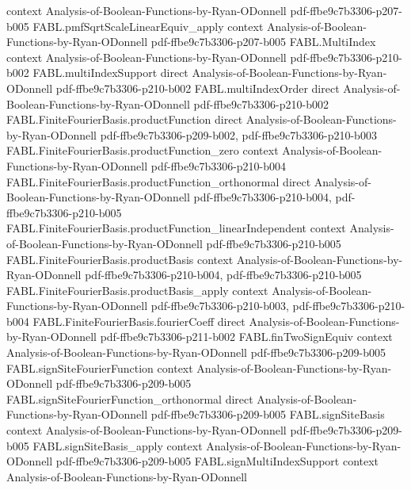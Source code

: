 \begin{theorem}
  {context}
  {Analysis-of-Boolean-Functions-by-Ryan-ODonnell}
  {pdf-ffbe9c7b3306-p207-b005}
\proofstep
  {FABL.pmfSqrtScaleLinearEquiv_apply}
  {context}
  {Analysis-of-Boolean-Functions-by-Ryan-ODonnell}
  {pdf-ffbe9c7b3306-p207-b005}
\proofstep
  {FABL.MultiIndex}
  {context}
  {Analysis-of-Boolean-Functions-by-Ryan-ODonnell}
  {pdf-ffbe9c7b3306-p210-b002}
\proofstep
  {FABL.multiIndexSupport}
  {direct}
  {Analysis-of-Boolean-Functions-by-Ryan-ODonnell}
  {pdf-ffbe9c7b3306-p210-b002}
\proofstep
  {FABL.multiIndexOrder}
  {direct}
  {Analysis-of-Boolean-Functions-by-Ryan-ODonnell}
  {pdf-ffbe9c7b3306-p210-b002}
\proofstep
  {FABL.FiniteFourierBasis.productFunction}
  {direct}
  {Analysis-of-Boolean-Functions-by-Ryan-ODonnell}
  {pdf-ffbe9c7b3306-p209-b002,
    pdf-ffbe9c7b3306-p210-b003}
\proofstep
  {FABL.FiniteFourierBasis.productFunction_zero}
  {context}
  {Analysis-of-Boolean-Functions-by-Ryan-ODonnell}
  {pdf-ffbe9c7b3306-p210-b004}
\proofstep
  {FABL.FiniteFourierBasis.productFunction_orthonormal}
  {direct}
  {Analysis-of-Boolean-Functions-by-Ryan-ODonnell}
  {pdf-ffbe9c7b3306-p210-b004,
    pdf-ffbe9c7b3306-p210-b005}
\proofstep
  {FABL.FiniteFourierBasis.productFunction_linearIndependent}
  {context}
  {Analysis-of-Boolean-Functions-by-Ryan-ODonnell}
  {pdf-ffbe9c7b3306-p210-b005}
\proofstep
  {FABL.FiniteFourierBasis.productBasis}
  {context}
  {Analysis-of-Boolean-Functions-by-Ryan-ODonnell}
  {pdf-ffbe9c7b3306-p210-b004,
    pdf-ffbe9c7b3306-p210-b005}
\proofstep
  {FABL.FiniteFourierBasis.productBasis_apply}
  {context}
  {Analysis-of-Boolean-Functions-by-Ryan-ODonnell}
  {pdf-ffbe9c7b3306-p210-b003,
    pdf-ffbe9c7b3306-p210-b004}
\proofstep
  {FABL.FiniteFourierBasis.fourierCoeff}
  {direct}
  {Analysis-of-Boolean-Functions-by-Ryan-ODonnell}
  {pdf-ffbe9c7b3306-p211-b002}
\proofstep
  {FABL.finTwoSignEquiv}
  {context}
  {Analysis-of-Boolean-Functions-by-Ryan-ODonnell}
  {pdf-ffbe9c7b3306-p209-b005}
\proofstep
  {FABL.signSiteFourierFunction}
  {context}
  {Analysis-of-Boolean-Functions-by-Ryan-ODonnell}
  {pdf-ffbe9c7b3306-p209-b005}
\proofstep
  {FABL.signSiteFourierFunction_orthonormal}
  {direct}
  {Analysis-of-Boolean-Functions-by-Ryan-ODonnell}
  {pdf-ffbe9c7b3306-p209-b005}
\proofstep
  {FABL.signSiteBasis}
  {context}
  {Analysis-of-Boolean-Functions-by-Ryan-ODonnell}
  {pdf-ffbe9c7b3306-p209-b005}
\proofstep
  {FABL.signSiteBasis_apply}
  {context}
  {Analysis-of-Boolean-Functions-by-Ryan-ODonnell}
  {pdf-ffbe9c7b3306-p209-b005}
\proofstep
  {FABL.signMultiIndexSupport}
  {context}
  {Analysis-of-Boolean-Functions-by-Ryan-ODonnell}

\end{theorem}
